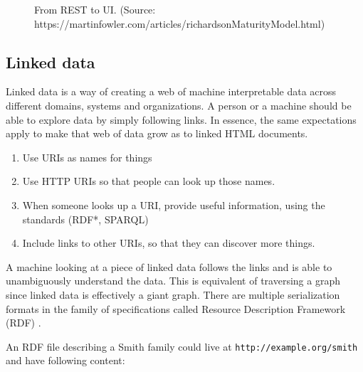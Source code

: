 \begin{figure}[!htb]
  \caption{From REST to UI. (Source: https://martinfowler.com/articles/richardsonMaturityModel.html)}
\end{figure}

\subsection{Linked data}\label{linkeddata}
Linked data is a way of creating a web of machine interpretable data across different domains, systems and organizations. A person or a machine should be able to explore data by simply following links. In essence, the same expectations apply to make that web of data grow as to linked HTML documents. \citep{linkedatafourrules}

\begin{enumerate}
  \item Use URIs as names for things
  \item Use HTTP URIs so that people can look up those names.
  \item When someone looks up a URI, provide useful information, using the standards (RDF*, SPARQL)
  \item Include links to other URIs, so that they can discover more things.
\end{enumerate}

A machine looking at a piece of linked data follows the links and is able to unambiguously understand the data. This is equivalent of traversing a graph since linked data is effectively a giant graph. There are multiple serialization formats in the family of specifications called Resource Description Framework (RDF) \citep{rdfspecification}.

An RDF file describing a Smith family could live at \lstinline{http://example.org/smith} and have following content:

